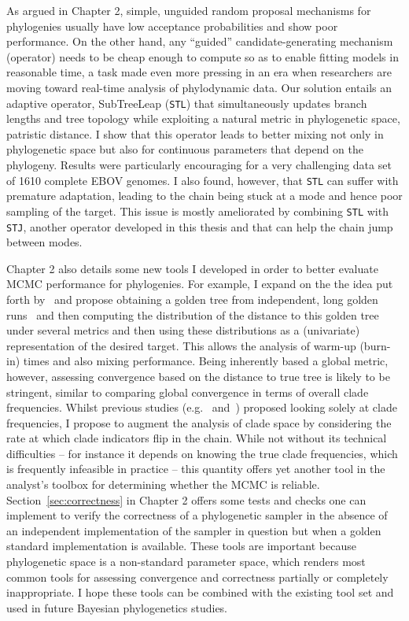 As argued in Chapter 2, simple, unguided random proposal mechanisms for phylogenies usually have low acceptance probabilities and show poor performance.
On the other hand, any ``guided'' candidate-generating mechanism (operator) needs to be cheap enough to compute so as to enable fitting models in reasonable time, a task made even more pressing in an era when researchers are moving toward real-time analysis of phylodynamic data.
Our solution entails an adaptive operator, SubTreeLeap (\verb|STL|) that simultaneously updates branch lengths and tree topology while exploiting a natural metric in phylogenetic space, patristic distance.
I show that this operator leads to better mixing not only in phylogenetic space but also for continuous parameters that depend on the phylogeny.
Results were particularly encouraging for a very challenging data set of 1610 complete EBOV genomes.
I also found, however, that \verb|STL| can suffer with premature adaptation, leading to the chain being stuck at a mode and hence poor sampling of the target.
This issue is mostly ameliorated by combining \verb|STL| with \verb|STJ|, another operator developed in this thesis and that can help the chain jump between modes.

Chapter 2 also details some new tools I developed in order to better evaluate MCMC performance for phylogenies.
For example, I expand on the the idea put forth by~\cite{Lanfear2016} and propose obtaining a golden tree from independent, long golden runs~\citep{Hoehna2008,Lakner2008} and then computing the distribution of the distance to this golden tree under several metrics and then using these distributions as a (univariate) representation of the desired target.
This allows the analysis of warm-up (burn-in) times and also mixing performance.
Being inherently  based a global metric, however, assessing convergence based on the distance to true tree is likely to be stringent, similar to comparing global convergence in terms of overall clade frequencies.
Whilst previous studies (e.g.~\cite{Lakner2008} and~\cite{Hoehna2008}) proposed looking solely at clade frequencies, I propose to augment the analysis of clade space by considering the rate at which clade indicators flip in the chain.
While not without its technical difficulties -- for instance it depends on knowing the true clade frequencies, which is frequently infeasible in practice -- this quantity offers yet another tool in the analyst's toolbox for determining whether the MCMC is reliable.
Section~\ref{sec:correctness} in Chapter 2 offers some tests and checks one can implement to verify the correctness of a phylogenetic sampler in the absence of an independent implementation of the sampler in question but when a golden standard implementation is available.
These tools are important because phylogenetic space is a non-standard parameter space, which renders most common tools for assessing convergence and correctness partially or completely inappropriate.
I hope these tools can be combined with the existing tool set and used in future Bayesian phylogenetics studies.

